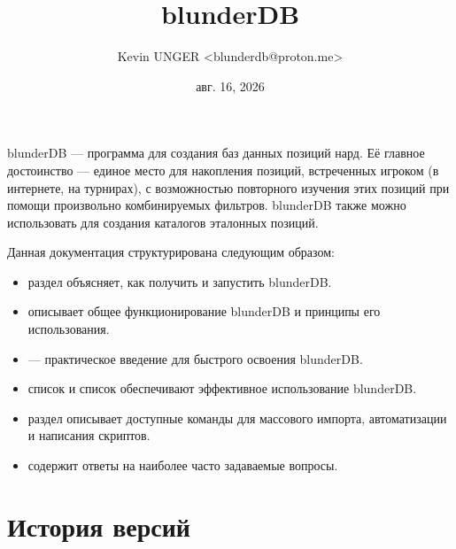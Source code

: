 \documentclass[letterpaper,10pt,russian]{sphinxmanual}
\title{blunderDB}
\date{авг. 16, 2026}
\author{Kevin UNGER <blunderdb@proton.me>}
\begin{document}
\pagestyle{empty}
\sphinxmaketitle
\pagestyle{plain}
\sphinxtableofcontents
\pagestyle{normal}
\label{\detokenize{index::doc}}


\sphinxAtStartPar
blunderDB — программа для создания баз данных позиций нард. Её главное достоинство — единое место для накопления позиций, встреченных игроком (в интернете, на турнирах), с возможностью повторного изучения этих позиций при помощи произвольно комбинируемых фильтров. blunderDB также можно использовать для создания каталогов эталонных позиций.

\sphinxAtStartPar
Данная документация структурирована следующим образом:
\begin{itemize}
\item {} 
\sphinxAtStartPar
раздел  объясняет, как получить и запустить blunderDB.

\item {} 
\sphinxAtStartPar
{} описывает общее функционирование blunderDB и принципы его использования.

\item {} 
\sphinxAtStartPar
{} — практическое введение для быстрого освоения blunderDB.

\item {} 
\sphinxAtStartPar
список  и список  обеспечивают эффективное использование blunderDB.

\item {} 
\sphinxAtStartPar
раздел  описывает доступные команды для массового импорта, автоматизации и написания скриптов.

\item {} 
\sphinxAtStartPar
{} содержит ответы на наиболее часто задаваемые вопросы.

\end{itemize}


\chapter{История версий}
\label{\detokenize{index:historique-des-versions}}
\end{document}

